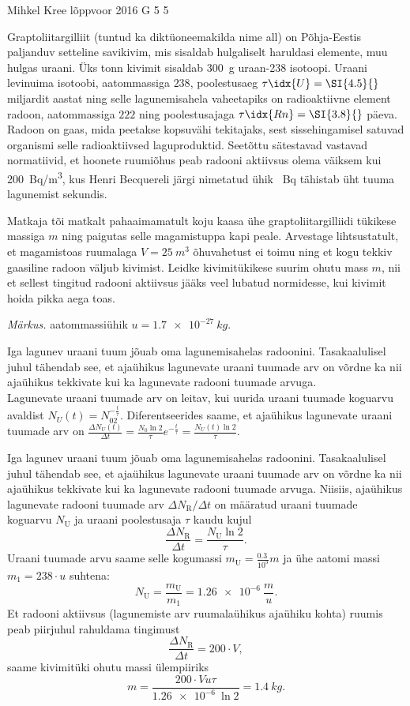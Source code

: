 {Mihkel Kree} %
{lõppvoor} %
{2016} %
{G 5} %
{5} %
{
\ifStatement
Graptoliitargilliit (tuntud ka diktüoneemakilda nime all) on Põhja-Eestis paljanduv setteline savikivim, mis sisaldab hulgaliselt haruldasi elemente, muu hulgas uraani. Üks tonn kivimit sisaldab \SI{300}{g} uraan-238 isotoopi. Uraani levinuima isotoobi, aatommassiga $238$, poolestusaeg $\tau\idx{U}=\SI{4.5}{}$ miljardit aastat ning selle lagunemisahela vaheetapiks on radioaktiivne element radoon, aatommassiga $222$ ning poolestusajaga $\tau\idx{Rn}=\SI{3.8}{}$ päeva. Radoon on gaas, mida peetakse kopsuvähi tekitajaks, sest sissehingamisel satuvad organismi selle radioaktiivsed laguproduktid. Seetõttu sätestavad vastavad normatiivid, et hoonete ruumiõhus peab radooni aktiivsus olema väiksem kui \SI{200}{Bq/m^3}, kus	Henri Becquereli järgi nimetatud ühik \SI{}{Bq} tähistab üht tuuma lagunemist sekundis.

Matkaja tõi matkalt pahaaimamatult koju kaasa ühe graptoliitargilliidi tükikese massiga $m$ ning paigutas selle magamistuppa kapi peale. Arvestage lihtsustatult, et magamistoas ruumalaga $V=\SI{25}{m^3}$ õhuvahetust ei toimu ning et kogu tekkiv gaasiline radoon väljub kivimist. Leidke kivimitükikese suurim ohutu mass $m$, nii et sellest tingitud radooni aktiivsus jääks veel lubatud normidesse, kui kivimit hoida pikka aega toas. 

\emph{Märkus.} aatommassiühik $u=\SI{1.7e-27}{kg}$.
\fi


\ifHint
Iga lagunev uraani tuum jõuab oma lagunemisahelas radoonini. Tasakaalulisel juhul tähendab see, et ajaühikus lagunevate uraani tuumade arv on võrdne ka nii ajaühikus tekkivate kui ka lagunevate radooni tuumade arvuga.\\
Lagunevate uraani tuumade arv on leitav, kui uurida uraani tuumade koguarvu avaldist $N_U(t) = N_02^{-\frac{t}{\tau}}$. Diferentseerides saame, et ajaühikus lagunevate uraani tuumade arv on $\frac{\Delta N_U(t)}{\Delta t} = \frac{N_0\ln 2}{\tau}e^{-\frac{t}{\tau}} = \frac{N_U(t)\ln 2}{\tau}$. 
\fi


\ifSolution
Iga lagunev uraani tuum jõuab oma lagunemisahelas radoonini. Tasakaalulisel juhul tähendab see, et ajaühikus lagunevate uraani tuumade arv on võrdne ka nii ajaühikus tekkivate kui ka lagunevate radooni tuumade arvuga. Niisiis, ajaühikus lagunevate radooni tuumade arv $\Delta N_\text{R} / \Delta t$ on määratud uraani tuumade koguarvu $N_\text{U}$ ja uraani poolestusaja $\tau$ kaudu kujul
\[
\frac{\Delta N_\text{R}}{\Delta t} = \frac{N_\text{U} \ln 2}{\tau}.
\]
Uraani tuumade arvu saame selle kogumassi $m_\text{U} = \frac{\SI{0.3}{}}{10^3} m$ ja ühe aatomi massi $m_1=238 \cdot u$ suhtena:
\[
N_\text{U}=\frac{m_\text{U}}{m_1}=\SI{1.26e-6}{} \frac{m}{u}.
\]
Et radooni aktiivsus (lagunemiste arv ruumalaühikus ajaühiku kohta) ruumis peab piirjuhul rahuldama tingimust
\[
\frac{\Delta N_\text{R}}{\Delta t} = 200\cdot V,
\]
saame kivimitüki ohutu massi ülempiiriks
\[
m = \frac{200\cdot V u \tau}{\SI{1.26e-6}{}\ln 2}=\SI{1.4}{kg}.
\]
\fi


}
